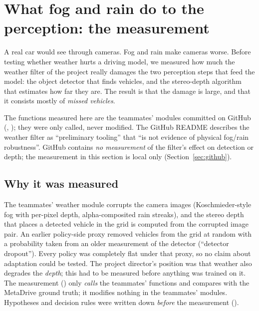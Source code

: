 \section{What fog and rain do to the perception: the measurement}\label{sec:perception}

\begin{plainwords}
A real car would see through cameras. Fog and rain make cameras worse. Before testing whether weather hurts a driving model, we measured how much the weather filter of the project really damages the two perception steps that feed the model: the object detector that finds vehicles, and the stereo-depth algorithm that estimates how far they are. The result is that the damage is large, and that it consists mostly of \emph{missed vehicles}.
\end{plainwords}
\begin{cautionbox}
The functions measured here are the teammates' modules committed on GitHub (, ); they were only called, never modified. The GitHub README describes the weather filter as ``preliminary tooling'' that ``is not evidence of physical fog/rain robustness''. GitHub contains \emph{no measurement} of the filter's effect on detection or depth; the measurement in this section is local only (Section~\ref{sec:github}).
\end{cautionbox}


\subsection{Why it was measured}
The teammates' weather module corrupts the camera images (Koschmieder-style fog with per-pixel depth, alpha-composited rain streaks), and the stereo depth that places a detected vehicle in the grid is computed from the corrupted image pair.
An earlier policy-side proxy removed vehicles from the grid at random with a probability taken from an older measurement of the detector (``detector dropout''). Every policy was completely flat under that proxy, so no claim about adaptation could be tested.
The project director's position was that weather also degrades the \emph{depth}; this had to be measured before anything was trained on it. The measurement () only \emph{calls} the teammates' functions and compares with the MetaDrive ground truth; it modifies nothing in the teammates' modules.
Hypotheses and decision rules were written down \emph{before} the measurement ().

